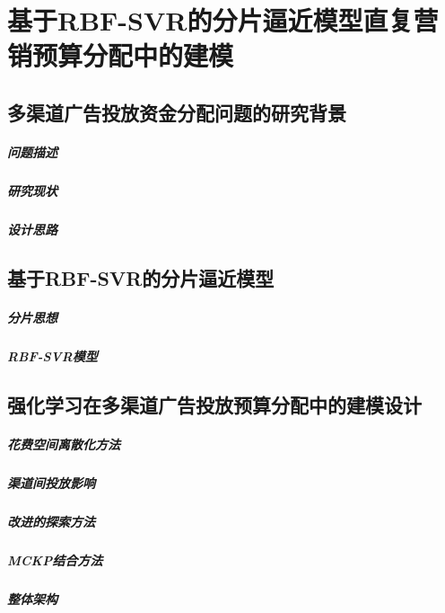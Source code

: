 \chapter{基于RBF-SVR的分片逼近模型直复营销预算分配中的建模}



\section{多渠道广告投放资金分配问题的研究背景}
\paragraph{问题描述}
\paragraph{研究现状}
\paragraph{设计思路}

\section{基于RBF-SVR的分片逼近模型}
\paragraph{分片思想}
\paragraph{RBF-SVR模型}

\section{强化学习在多渠道广告投放预算分配中的建模设计}
\paragraph{花费空间离散化方法}
\paragraph{渠道间投放影响}
\paragraph{改进的探索方法}
\paragraph{MCKP结合方法}
\paragraph{整体架构}